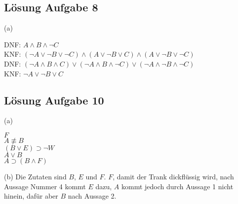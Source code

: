 \documentclass[a4paper, margins=3cm]{homework}
\begin{document}
\subsection*{Lösung Aufgabe 8}
(a)
\begin{center}
	DNF: $A\wedge B \wedge \neg C$ \\
	KNF: $(\neg A \vee \neg B \vee \neg C) \wedge (A\vee \neg B \vee C)\wedge (A\vee \neg B\vee \neg C)$\\

	DNF: $(\neg A \wedge B \wedge C) \vee (\neg A \wedge B \wedge \neg C) \vee (\neg A \wedge \neg B \wedge \neg C)$ \\
	KNF: $\neg A \vee \neg B \vee C$
\end{center}

\subsection*{Lösung Aufgabe 10}
(a)
\begin{center}
	$F$ \\ 
	$A \not\equiv B$ \\
	$(B \vee E) \supset \neg W$ \\
	$A \vee B$ \\
	$A \supset (B \wedge F)$
\end{center}
(b)
Die Zutaten sind $B$, $E$ und $F$. $F$, damit der Trank dickflüssig wird, nach Aussage
Nummer 4 kommt $E$ dazu, $A$ kommt jedoch durch Aussage 1 nicht hinein, dafür aber $B$
nach Aussage 2.
\end{document}
